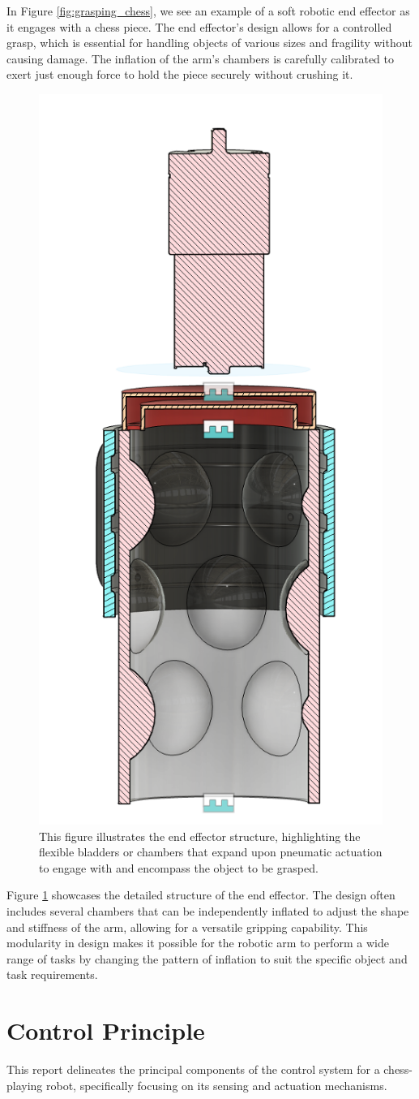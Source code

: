 \documentclass[10pt, a4paper, twocolumn]{article}
\begin{document}
In Figure \ref{fig:grasping_chess}, we see an example of a soft robotic end effector as it engages with a chess piece. The end effector's design allows for a controlled grasp, which is essential for handling objects of various sizes and fragility without causing damage. The inflation of the arm's chambers is carefully calibrated to exert just enough force to hold the piece securely without crushing it.

\begin{figure}[H]
\centering
\includegraphics[width=0.3\linewidth]{end effector.png}
\caption{This figure illustrates the end effector structure, highlighting the flexible bladders or chambers that expand upon pneumatic actuation to engage with and encompass the object to be grasped.}
\label{fig:end_effector}
\end{figure}

Figure \ref{fig:end_effector} showcases the detailed structure of the end effector. The design often includes several chambers that can be independently inflated to adjust the shape and stiffness of the arm, allowing for a versatile gripping capability. This modularity in design makes it possible for the robotic arm to perform a wide range of tasks by changing the pattern of inflation to suit the specific object and task requirements.

\section{Control Principle}

This report delineates the principal components of the control system for a chess-playing robot, specifically focusing on its sensing and actuation mechanisms.
\end{document}
